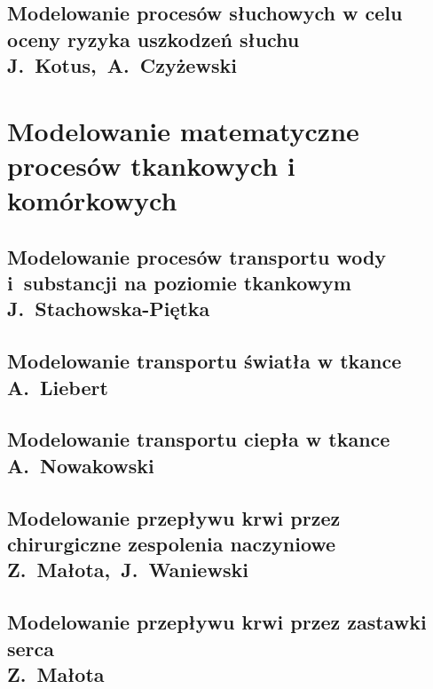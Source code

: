 \documentclass[11pt,a4paper,twoside,openright,final]{memoir}
\begin{document}
			\chapter[Modelowanie procesów słuchowych w celu oceny ryzyka uszkodzeń słuchu]{Modelowanie procesów słuchowych w celu oceny ryzyka uszkodzeń słuchu\\{\Large J.~Kotus,~A.~Czyżewski}}
			
			
		\part{Modelowanie matematyczne procesów tkankowych i komórkowych}
		
			\chapter[Modelowanie procesów transportu wody i~substancji na poziomie tkankowym]{Modelowanie procesów transportu wody i~substancji na poziomie tkankowym\\{\Large J.~Stachowska-Piętka}}
			
			\chapter[Modelowanie transportu światła w tkance]{Modelowanie transportu światła w tkance\\{\Large A.~Liebert}}
			
			\chapter[Modelowanie transportu ciepła w tkance]{Modelowanie transportu ciepła w tkance\\{\Large A.~Nowakowski}}
			
			\chapter[Modelowanie przepływu krwi przez chirurgiczne zespolenia naczyniowe]{Modelowanie przepływu krwi przez chirurgiczne zespolenia naczyniowe\\{\Large Z.~Małota,~J.~Waniewski}}
			
			\chapter[Modelowanie przepływu krwi przez zastawki serca]{Modelowanie przepływu krwi przez zastawki serca\\{\Large Z.~Małota}}
			
\end{document}
